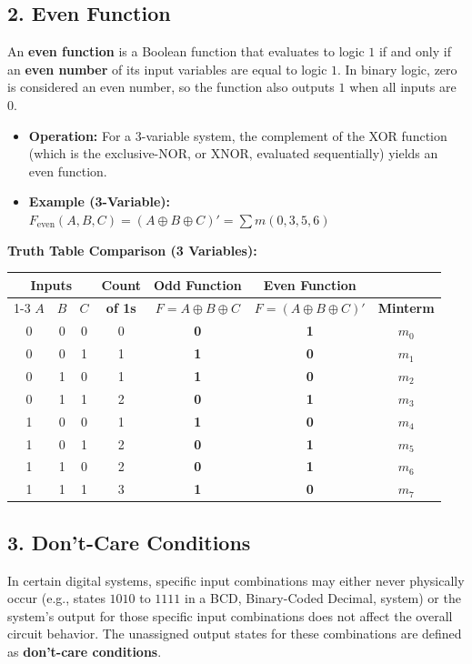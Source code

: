 \documentclass[12pt,a3paper]{article}
\begin{document}
\begin{enumerate}
\begin{tcolorbox}[enhanced,breakable,ansbox,colback=cA!4,colframe=cA,boxrule=0.8pt,arc=5pt,title={\textbf{Answer}},fonttitle=\bfseries\color{white},colbacktitle=cA]
\subsection*{2. Even Function}
An \textbf{even function} is a Boolean function that evaluates to logic $1$ if and only if an \textbf{even number} of its input variables are equal to logic $1$. In binary logic, zero is considered an even number, so the function also outputs $1$ when all inputs are $0$.
\begin{itemize}
    \item \textbf{Operation:} For a $3$-variable system, the complement of the XOR function (which is the exclusive-NOR, or XNOR, evaluated sequentially) yields an even function.
    \item \textbf{Example (3-Variable):} $F_{\text{even}}(A,B,C) = (A \oplus B \oplus C)' = \sum m(0, 3, 5, 6)$
\end{itemize}

\vspace{0.3cm}
\textbf{Truth Table Comparison (3 Variables):}
\begin{center}
\begin{tabular}{ccccccc}
\toprule
\multicolumn{3}{c}{\textbf{Inputs}} & \textbf{Count} & \textbf{Odd Function} & \textbf{Even Function} & \\
\cmidrule(r){1-3}
$A$ & $B$ & $C$ & \textbf{of 1s} & $F = A \oplus B \oplus C$ & $F = (A \oplus B \oplus C)'$ & \textbf{Minterm} \\
\midrule
0 & 0 & 0 & 0 & \textbf{0} & \textbf{1} & $m_0$ \\
0 & 0 & 1 & 1 & \textbf{1} & \textbf{0} & $m_1$ \\
0 & 1 & 0 & 1 & \textbf{1} & \textbf{0} & $m_2$ \\
0 & 1 & 1 & 2 & \textbf{0} & \textbf{1} & $m_3$ \\
1 & 0 & 0 & 1 & \textbf{1} & \textbf{0} & $m_4$ \\
1 & 0 & 1 & 2 & \textbf{0} & \textbf{1} & $m_5$ \\
1 & 1 & 0 & 2 & \textbf{0} & \textbf{1} & $m_6$ \\
1 & 1 & 1 & 3 & \textbf{1} & \textbf{0} & $m_7$ \\
\bottomrule
\end{tabular}
\end{center}

\vspace{0.5cm}

\subsection*{3. Don't-Care Conditions}
In certain digital systems, specific input combinations may either never physically occur (e.g., states $1010$ to $1111$ in a BCD, Binary-Coded Decimal, system) or the system's output for those specific input combinations does not affect the overall circuit behavior. The unassigned output states for these combinations are defined as \textbf{don't-care conditions}.


\end{tcolorbox}
\end{enumerate}
\end{document}
